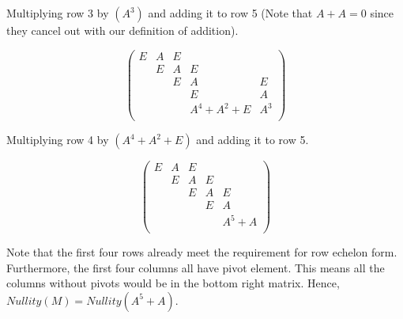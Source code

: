 \documentclass[a4paper, 12pt]{article}
\begin{document}
Multiplying row 3 by $(A^3)$ and adding it to row 5 (Note that $A+A=0$ since they cancel out with our definition of addition).
\vspace{-0.5cm}
\begin{singlespace}
\begin{equation*}
\begin{pmatrix}
E&A&E&&\\
&E&A&E&\\
&&E&A&E\\
&&&E&A\\
&&&A^4+A^2+E&A^3\\
\end{pmatrix}
\end{equation*}
\end{singlespace}
Multiplying row 4 by $(A^4+A^2 + E)$ and adding it to row 5.
\vspace{-0.5cm}
\begin{singlespace}
\begin{equation*}
\begin{pmatrix}
E&A&E&&\\
&E&A&E&\\
&&E&A&E\\
&&&E&A\\
&&&&A^5+A\\
\end{pmatrix}
\end{equation*}
\end{singlespace}

Note that the first four rows already meet the requirement for row echelon form. Furthermore, the first four columns all have pivot element. This means all the columns without pivots would be in the bottom right matrix. Hence, $Nullity(M) = Nullity(A^5+A)$.
\end{document}
